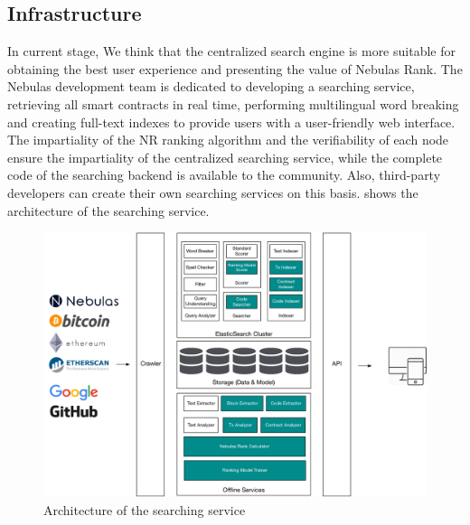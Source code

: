 \subsection{Infrastructure}

In current stage, We think that the centralized search engine is more suitable for obtaining the best user experience and presenting the value of Nebulas Rank. The Nebulas development team is dedicated to developing a searching service, retrieving all smart contracts in real time, performing multilingual word breaking and creating full-text indexes to provide users with a user-friendly web interface. The impartiality of the NR ranking algorithm and the verifiability of each node ensure the impartiality of the centralized searching service, while the complete code of the searching backend is available to the community. Also, third-party developers can create their own searching services on this basis.  shows the architecture of the searching service.


\begin{figure}[h]
\centering
\includegraphics[width=16cm]{./figs/search-arch-new}
\caption{Architecture of the searching service}
\label{fig:search-arch}
\end{figure}


